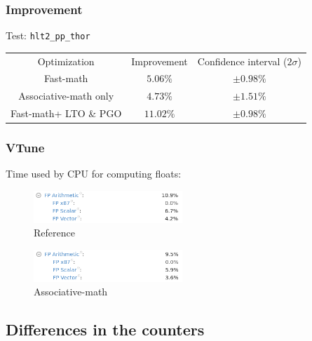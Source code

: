\documentclass{beamer}
\begin{document}
\begin{frame}[fragile]
    \frametitle{Improvement}

    Test: \verb'hlt2_pp_thor'
    \begin{center}
        \begin{tabular}{ c c c }
            Optimization                           & Improvement & Confidence interval ($2\sigma$) \\
            Fast-math\footnotemark[1]              & $5.06\%$    & $\pm 0.98\%$                    \\
            Associative-math only                  & $4.73\%$    & $\pm 1.51\%$                    \\
            Fast-math\footnotemark[1] + LTO \& PGO & $11.02\%$   & $\pm 0.98\%$
        \end{tabular}
    \end{center}

\end{frame}

\begin{frame}[fragile]
    \frametitle{VTune}

    Time used by CPU for computing floats:

    \begin{figure}[!htb]
        \includegraphics[width=0.5\textwidth, center]{reference_vtune.png}
        \caption{Reference}
    \end{figure}

    \begin{figure}[!htb]
        \includegraphics[width=0.5\textwidth, center]{associative-math_vtune.png}
        \caption{Associative-math}
    \end{figure}
\end{frame}

\subsection{Differences in the counters}
\end{document}
